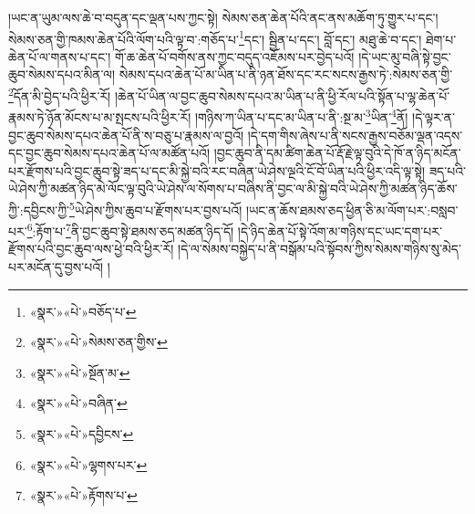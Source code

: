 །ཡང་ན་ཡུམ་ལས་ཆེ་བ་བདུན་དང་ལྡན་པས་ཀྱང་སྟེ། སེམས་ཅན་ཆེན་པོའི་ནང་ནས་མཆོག་ཏུ་གྱུར་པ་དང་། སེམས་ཅན་གྱི་ཁམས་ཆེན་པོའི་ལོག་པའི་ལྟ་བ་:གཅོད་པ་\footnote{«སྣར་»«པེ་»བཅོད་པ་}དང་། སྦྱིན་པ་དང་། བློ་དང་། མཐུ་ཆེ་བ་དང་། ཐེག་པ་ཆེན་པོ་ལ་གནས་པ་དང་། གོ་ཆ་ཆེན་པོ་བགོས་ནས་ཀྱང་བདུད་འཇོམས་པར་བྱེད་པའོ། །དེ་ཡང་མུ་བཞི་སྟེ་བྱང་ཆུབ་སེམས་དཔའ་མིན་ལ། སེམས་དཔའ་ཆེན་པོ་མ་ཡིན་པ་ནི་ཉན་ཐོས་དང་རང་སངས་རྒྱས་ཏེ་:སེམས་ཅན་གྱི་\footnote{«སྣར་»«པེ་»སེམས་ཅན་གྱིས་}དོན་མི་བྱེད་པའི་ཕྱིར་རོ། །ཆེན་པོ་ཡིན་ལ་བྱང་ཆུབ་སེམས་དཔའ་མ་ཡིན་པ་ནི་ཕྱི་རོལ་པའི་སྟོན་པ་ལྷ་ཆེན་པོ་རྣམས་ཏེ་ཉོན་མོངས་པ་མ་སྤངས་པའི་ཕྱིར་རོ། །གཉིས་ཀ་ཡིན་པ་དང་མ་ཡིན་པ་ནི་:སྔ་མ་\footnote{«སྣར་»«པེ་»སྔོན་མ་}ཡིན་\footnote{«སྣར་»«པེ་»བཞིན་}ནོ། །དེ་ལྟར་ན་བྱང་ཆུབ་སེམས་དཔའ་ཆེན་པོ་ནི་ས་བཅུ་པ་རྣམས་ལ་བྱའོ། །དེ་དག་གིས་ཞེས་པ་ནི་སངས་རྒྱས་བཅོམ་ལྡན་འདས་དང་བྱང་ཆུབ་སེམས་དཔའ་ཆེན་པོ་ལ་མཚོན་པའོ། །བྱང་ཆུབ་ནི་དམ་ཚིག་ཆེན་པོ་རྡོ་རྗེ་ལྟ་བུའི་དེ་ཁོ་ན་ཉིད་མངོན་པར་རྫོགས་པའི་བྱང་ཆུབ་སྟེ་ཟད་པ་དང་མི་སྐྱེ་བའི་རང་བཞིན་ཡེ་ཤེས་ལྔའི་ངོ་བོ་ཡིན་པའི་ཕྱིར་འདི་ལྟ་སྟེ། ཟད་པའི་ཡེ་ཤེས་ཀྱི་མཚན་ཉིད་མེ་ལོང་ལྟ་བུའི་ཡེ་ཤེས་ལ་སོགས་པ་བཞིས་ནི་བྱང་ལ་མི་སྐྱེ་བའི་ཡེ་ཤེས་ཀྱི་མཚན་ཉིད་ཆོས་ཀྱི་:དབྱིངས་ཀྱི་\footnote{«སྣར་»«པེ་»དབྱིངས་}ཡེ་ཤེས་ཀྱིས་ཆུབ་པ་རྫོགས་པར་བྱས་པའོ། །ཡང་ན་ཆོས་ཐམས་ཅད་ཕྱིན་ཅི་མ་ལོག་པར་:བསླབ་པར་\footnote{«སྣར་»«པེ་»ལྷགས་པར་}:རྟོག་པ་\footnote{«སྣར་»«པེ་»རྟོགས་པ་}ནི་བྱང་ཆུབ་སྟེ་ཐམས་ཅད་མཚན་ཉིད་དོ། །དེ་ཉིད་ཆེན་པོ་སྟེ་འོག་མ་གཉིས་དང་ཡང་དག་པར་རྫོགས་པའི་བྱང་ཆུབ་ལས་ཕྱེ་བའི་ཕྱིར་རོ། །དེ་ལ་སེམས་བསྐྱེད་པ་ནི་བསྒོམ་པའི་སྟོབས་ཀྱིས་སེམས་གཉིས་སུ་མེད་པར་མངོན་དུ་བྱས་པའོ། །
